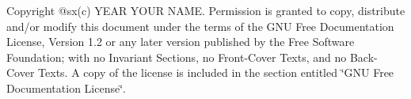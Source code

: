 Copyright @sx(c) YEAR YOUR NAME. Permission is granted to copy, distribute and/or modify this document under the terms of the GNU Free Documentation License, Version 1.2 or any later version published by the Free Software Foundation; with no Invariant Sections, no Front-\/Cover Texts, and no Back-\/Cover Texts. A copy of the license is included in the section entitled \char`\"{}GNU
Free Documentation License\char`\"{}.